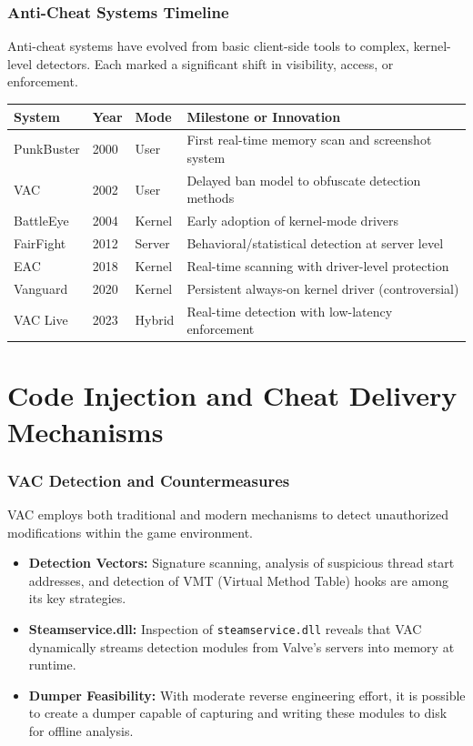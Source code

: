 \documentclass[aspectratio=169]{beamer}
\begin{document}
\begin{frame}
    \frametitle{Anti-Cheat Systems Timeline}
    Anti-cheat systems have evolved from basic client-side tools to complex, kernel-level detectors. Each marked a significant shift in visibility, access, or enforcement.
    \vspace{0.4cm}
    \begin{table}[]
        \small
        \begin{tabular}{|l|l|l|l|}
            \hline
            \textbf{System} & \textbf{Year} & \textbf{Mode} & \textbf{Milestone or Innovation} \\
            \hline
            PunkBuster & 2000 & User & First real-time memory scan and screenshot system \\
            VAC & 2002 & User & Delayed ban model to obfuscate detection methods \\
            BattleEye & 2004 & Kernel & Early adoption of kernel-mode drivers \\
            FairFight & 2012 & Server & Behavioral/statistical detection at server level \\
            EAC & 2018 & Kernel & Real-time scanning with driver-level protection \\
            Vanguard & 2020 & Kernel & Persistent always-on kernel driver (controversial) \\
            VAC Live & 2023 & Hybrid & Real-time detection with low-latency enforcement \\
            \hline
        \end{tabular}
    \end{table}
\end{frame}



\section{Code Injection and Cheat Delivery Mechanisms}


\begin{frame}
    \frametitle{VAC Detection and Countermeasures}
    VAC employs both traditional and modern mechanisms to detect unauthorized modifications within the game environment.
    \vspace{0.4cm}
    \begin{itemize}
        \item \textbf{Detection Vectors:} Signature scanning, analysis of suspicious thread start addresses, and detection of VMT (Virtual Method Table) hooks are among its key strategies.
        \pause
        \item \textbf{Steamservice.dll:} Inspection of \texttt{steamservice.dll} reveals that VAC dynamically streams detection modules from Valve’s servers into memory at runtime.
        \pause
        \item \textbf{Dumper Feasibility:} With moderate reverse engineering effort, it is possible to create a dumper capable of capturing and writing these modules to disk for offline analysis.
    \end{itemize}
\end{frame} 
\end{document}

